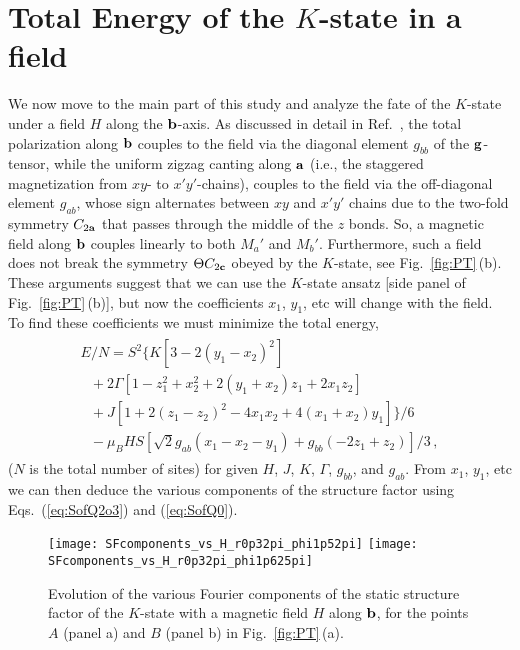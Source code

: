 \documentclass[prx,aps,groupedaddress,twocolumn]{revtex4-1}
\def\cdbl{\color{darkblue}}
\def\bea{\begin{eqnarray}}
\def\eea{\end{eqnarray}}
\begin{document}
\section{Total Energy of the $K$-state in a field}
\vspace*{-0.3cm}
We now move to the main part of this study and analyze the fate of the $K$-state under a field $H$ along the ${\bf b}$-axis. 
%
As discussed in detail in Ref.~\cite{Ruiz2017}, the total polarization along ${\bf b}$ couples to the field via the diagonal element $g_{bb}$ of the ${\bf g}$-tensor, while the uniform zigzag canting along ${\bf a}$ (i.e., the staggered magnetization from $xy$- to $x'y'$-chains), couples to the field via the off-diagonal element $g_{ab}$, whose sign alternates between $xy$ and $x'y'$ chains due to the two-fold symmetry $C_{2{\bf a}}$ that passes through the middle of the $z$ bonds.  
%
So, a magnetic field along ${\bf b}$ couples linearly to both $M_a'$ and $M_b'$.  
%
Furthermore, such a field does not break the symmetry $\Theta C_{2{\bf c}}$ obeyed by the $K$-state, see Fig.~\ref{fig:PT}\,(b). 
%
These arguments suggest that we can use the $K$-state ansatz [side panel of Fig.~\ref{fig:PT}\,(b)], but now the coefficients $x_1$, $y_1$, etc will change with the field. 
%
To find these coefficients we must minimize the total energy,
\bea\label{eq:En}
\begin{array}{l}
E/N \!=\! S^2\Big\{
K \left[ 3-2(y_1-x_2)^2 \right] \\
~~~\!+\!2 \Gamma \left[1-z_1^2 + x_2^2  + 2 (y_1+x_2) z_1 + 2 x_1 z_2 \right] \\ 
~~~\!+\! J \left[1+2 (z_1-z_2)^2- 4 x_1 x_2  + 4 (x_1+x_2) y_1 \right] \Big\}/6 \\
~~~
\!-\! \mu_B H S \left[\sqrt{2} g_{ab} (x_1 - x_2 - y_1) + g_{bb} (-2 z_1 + z_2)\right]/3\,,
\end{array}
\eea
($N$ is the total number of sites) for given $H$, $J$, $K$, $\Gamma$, $g_{bb}$, and $g_{ab}$. From $x_1$, $y_1$, etc we can then deduce the various components of the structure factor using Eqs.~(\ref{eq:SofQ2o3}) and (\ref{eq:SofQ0}). 




\begin{figure}[!t]
\texttt{[image: SFcomponents\_vs\_H\_r0p32pi\_phi1p52pi]}
\texttt{[image: SFcomponents\_vs\_H\_r0p32pi\_phi1p625pi]}
\vspace*{-0.25cm}
\caption{Evolution of the various Fourier components of the static structure factor of the $K$-state with a magnetic field $H$ along ${\bf b}$, for the points $A$ (panel a) and $B$ (panel b) in Fig.~\ref{fig:PT}\,(a).}
\vspace*{-0.5cm}
\label{fig:SofQvsH}
\end{figure}  
\end{document}
